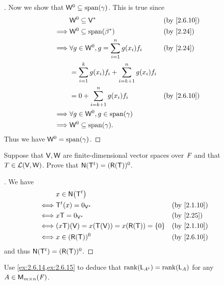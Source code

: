 \begin{proof}[]
  Now we show that \(\W^0 \subseteq \spn{\gamma}\).
  This is true since
  \begin{align*}
             & \W^0 \subseteq \V^*                                         &  & \text{(by \cref{2.6.10})} \\
    \implies & \W^0 \subseteq \spn{\beta^*}                                &  & \text{(by \cref{2.24})}   \\
    \implies & \forall g \in \W^0, g = \sum_{i = 1}^n g(x_i) f_i           &  & \text{(by \cref{2.24})}   \\
             & = \sum_{i = 1}^k g(x_i) f_i + \sum_{i = k + 1}^n g(x_i) f_i                                \\
             & = 0 + \sum_{i = k + 1}^n g(x_i) f_i                         &  & \text{(by \cref{2.6.10})} \\
    \implies & \forall g \in \W^0, g \in \spn{\gamma}                                                     \\
    \implies & \W^0 \subseteq \spn{\gamma}.
  \end{align*}
  Thus we have \(\W^0 = \spn{\gamma}\).
\end{proof}

\begin{ex}\label{ex:2.6.15}
  Suppose that \(\mathsf{V}, \mathsf{W}\) are finite-dimensional vector spaces over \(\mathit{F}\) and that \(T \in \mathcal{L}(\mathsf{V}, \mathsf{W})\).
  Prove that \(\ns{\tp{\T}} = (\rg{\T})^0\).
\end{ex}

\begin{proof}[]
  We have
  \begin{align*}
         & x \in \ns{\tp{\T}}                                                           \\
    \iff & \tp{\T}(x) = 0_{\V^*}                         &  & \text{(by \cref{2.1.10})} \\
    \iff & x \T = 0_{\V^*}                               &  & \text{(by \cref{2.25})}   \\
    \iff & (x \T)(\V) = x(\T(\V)) = x(\rg{\T}) = \set{0} &  & \text{(by \cref{2.1.10})} \\
    \iff & x \in (\rg{\T})^0                             &  & \text{(by \cref{2.6.10})}
  \end{align*}
  and thus \(\ns{\tp{\T}} = (\rg{\T})^0\).
\end{proof}

\begin{ex}\label{ex:2.6.16}
  Use \cref{ex:2.6.14,ex:2.6.15} to deduce that \(\rk{\L_{\tp{A}}} = \rk{\L_A}\) for any \(A \in \mathsf{M}_{{m} \times n}({\mathit{F}})\).
\end{ex}


